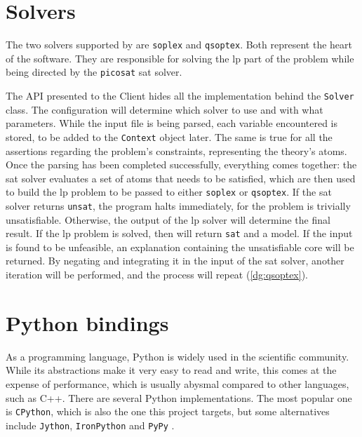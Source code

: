 \section{Solvers}

The two solvers supported by \dlinear are \texttt{soplex} and \texttt{qsoptex}.
Both represent the heart of the software.
They are responsible for solving the \gls{lp} part of the problem while being directed by the \texttt{picosat} \gls{sat} solver.

The API presented to the Client hides all the implementation behind the \texttt{Solver} class.
The configuration will determine which solver to use and with what parameters.
While the input file is being parsed, each variable encountered is stored, to be added to the \texttt{Context} object later.
The same is true for all the assertions regarding the problem's constraints, representing the theory's atoms.
Once the parsing has been completed successfully, everything comes together: the \gls{sat} solver evaluates a set of atoms that needs to be satisfied, which are then used to build the \gls{lp} problem to be passed to either \texttt{soplex} or \texttt{qsoptex}.
If the \gls{sat} solver returns \texttt{unsat}, the program halts immediately, for the problem is trivially unsatisfiable.
Otherwise, the output of the \gls{lp} solver will determine the final result.
If the \gls{lp} problem is solved, then \dlinear will return \texttt{sat} and a model.
If the input is found to be unfeasible, an explanation containing the unsatisfiable core will be returned.
By negating and integrating it in the input of the \gls{sat} solver, another iteration will be performed, and the process will repeat (\autoref{dg:qsoptex}).


\clearpage

\section{Python bindings}

As a programming language, Python is widely used in the scientific community.
While its abstractions make it very easy to read and write, this comes at the expense of performance, which is usually abysmal compared to other languages, such as C++.
There are several Python implementations.
The most popular one is \texttt{CPython}, which is also the one this project targets, but some alternatives include \texttt{Jython}, \texttt{IronPython} and \texttt{PyPy} \cite{man:python-implementations}.


